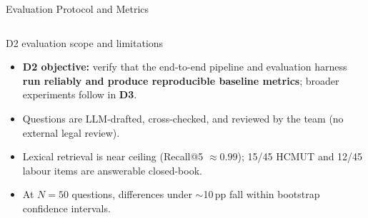 \documentclass[aspectratio=1610,11pt]{beamer}
\newcommand{\pp}{\,pp\xspace}
\begin{document}
\begin{frame}{Evaluation Protocol and Metrics}
\begin{columns}[T]
    \begin{alertblock}{D2 evaluation scope and limitations}
      \scriptsize
      \begin{itemize}
        \item \textbf{D2 objective:} verify that the end-to-end pipeline and evaluation harness \textbf{run reliably and produce reproducible baseline metrics}; broader experiments follow in \textbf{D3}.
        \item Questions are LLM-drafted, cross-checked, and reviewed by the team (no external legal review).
        \item Lexical retrieval is near ceiling (Recall@5 $\approx 0.99$); 15/45 HCMUT and 12/45 labour items are answerable closed-book.
        \item At $N=50$ questions, differences under $\sim$10\pp fall within bootstrap confidence intervals.
      \end{itemize}
    \end{alertblock}
  \end{columns}
\end{frame}
\end{document}
